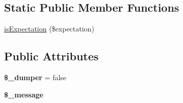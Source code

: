 \subsection*{Static Public Member Functions}
\begin{DoxyCompactItemize}
\item 
\hyperlink{class_simple_expectation_aa8d65472c1475069b18f5cb968c31aca}{isExpectation} (\$expectation)
\end{DoxyCompactItemize}
\subsection*{Public Attributes}
\begin{DoxyCompactItemize}
\item 
\hypertarget{class_simple_expectation_af5e4be55520bd8f7545406abfa7395c0}{
{\bfseries \$\_\-dumper} = false}
\label{class_simple_expectation_af5e4be55520bd8f7545406abfa7395c0}

\item 
\hypertarget{class_simple_expectation_a0e9ab4fa1749db0dec695838c4a10fc4}{
{\bfseries \$\_\-message}}
\label{class_simple_expectation_a0e9ab4fa1749db0dec695838c4a10fc4}

\end{DoxyCompactItemize}


